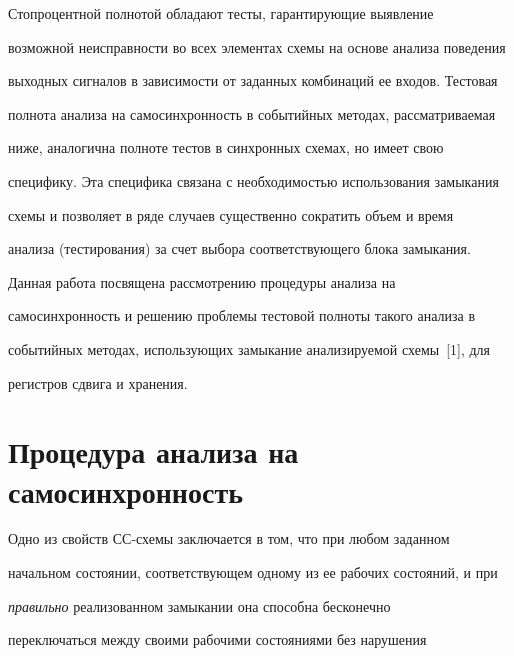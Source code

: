 Стопроцентной полнотой обладают тесты, гарантирующие выявление 


возможной неисправности во всех элементах схемы на основе анализа поведения 


выходных сигналов в зависимости от заданных комбинаций ее входов. Тестовая 


полнота анализа на самосинхронность в событийных методах, рассматриваемая 


ниже, аналогична полноте тестов в синхронных схемах, но имеет свою 


специфику. Эта специфика связана с необходимостью использования замыкания 


схемы и позволяет в ряде случаев существенно сократить объем и время 


анализа (тестирования) за счет выбора соответствующего блока замыкания.


      


      Данная работа посвящена рассмотрению процедуры анализа на 


самосинхронность и решению проблемы тестовой полноты такого анализа в 


событийных методах, использующих замыкание анализируемой схемы~[1], для 


регистров сдвига и хранения. 





\vspace*{-2pt}


      


      \section{Процедура анализа на самосинхронность}


      


      \vspace*{-1pt}


      


      Одно из свойств СС-схемы заключается в том, что при любом заданном 


начальном состоянии, соответствующем одному из ее рабочих состояний, и при 


\textit{правильно} реализованном замыкании она способна бесконечно 


переключаться между своими рабочими состояниями без нарушения 


